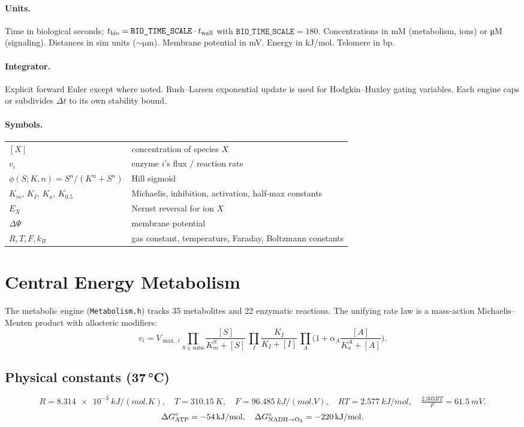 \documentclass[11pt,a4paper]{article}
\newcommand{\eq}[1]{\begin{equation}#1\end{equation}}
\begin{document}
\paragraph{Units.} Time in biological seconds; $t_{\rm bio} = \texttt{BIO\_TIME\_SCALE}\cdot t_{\rm wall}$ with $\texttt{BIO\_TIME\_SCALE} = 180$. Concentrations in \si{mM} (metabolism, ions) or \si{\micro M} (signaling). Distances in sim units ($\sim\si{\micro\meter}$). Membrane potential in \si{mV}. Energy in \si{kJ/mol}. Telomere in bp.

\paragraph{Integrator.} Explicit forward Euler except where noted. Rush--Larsen exponential update is used for Hodgkin--Huxley gating variables. Each engine caps or subdivides $\Delta t$ to its own stability bound.

\paragraph{Symbols.}
\begin{tabular}{@{}ll@{}}\toprule
$[X]$ & concentration of species $X$ \\
$v_i$ & enzyme $i$'s flux / reaction rate \\
$\phi(S;K,n) = S^n/(K^n+S^n)$ & Hill sigmoid \\
$K_m$, $K_I$, $K_a$, $K_{0.5}$ & Michaelis, inhibition, activation, half-max constants \\
$E_X$ & Nernst reversal for ion $X$ \\
$\Delta\Psi$ & membrane potential \\
$R, T, F, k_B$ & gas constant, temperature, Faraday, Boltzmann constants \\
\bottomrule
\end{tabular}

\clearpage
\section{Central Energy Metabolism}
\label{sec:metabolism}
The metabolic engine (\texttt{Metabolism.h}) tracks 35 metabolites and 22 enzymatic reactions. The unifying rate law is a mass-action Michaelis--Menten product with allosteric modifiers:
\eq{ v_i = V_{\max,i} \prod_{S\in\text{subs}}\frac{[S]}{K_m^S+[S]}\,\prod_{I}\frac{K_I}{K_I+[I]}\,\prod_A\bigg(1+\alpha_A\frac{[A]}{K_a^A+[A]}\bigg). }

\subsection{Physical constants (37\,\si{\celsius})}
\[ R=\SI{8.314e-3}{kJ/(mol.K)},\quad T=\SI{310.15}{K},\quad F=\SI{96.485}{kJ/(mol.V)},\quad RT=\SI{2.577}{kJ/mol},\quad \tfrac{2.303RT}{F}=\SI{61.5}{mV}. \]
\[ \Delta G^{\circ}_{\rm ATP} = -\SI{54}{kJ/mol},\quad \Delta G^{\circ}_{\rm NADH\to O_2} = -\SI{220}{kJ/mol}. \]
\end{document}
